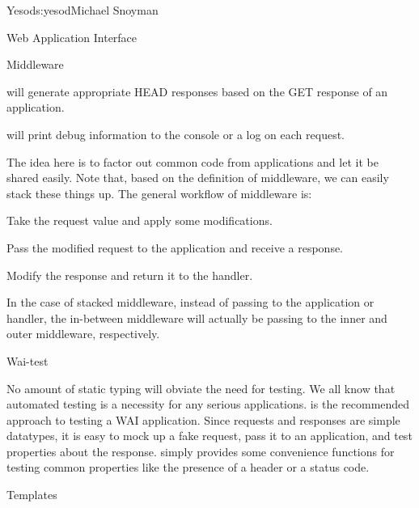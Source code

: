 \begin{aosachapter}{Yesod}{s:yesod}{Michael Snoyman}
\begin{aosasect1}{Web Application Interface}
\begin{aosasect2}{Middleware}
\begin{aosaitemize}
\item {} will generate appropriate HEAD responses based
  on the GET response of an application.

\item {} will print debug information to the console or a
  log on each request.

\end{aosaitemize}

The idea here is to factor out common code from applications and let
it be shared easily. Note that, based on the definition of 
middleware, we can easily stack these things up. The general workflow
of middleware is:

\begin{aosaenumerate}

\item Take the request value and apply some modifications.

\item Pass the modified request to the application and receive a
  response.

\item Modify the response and return it to the handler.

\end{aosaenumerate}

In the case of stacked middleware, instead of passing to the
application or handler, the in-between middleware will actually be passing to the
inner and outer middleware, respectively.

\end{aosasect2}

\begin{aosasect2}{Wai-test}

No amount of static typing will obviate the need for testing. We all
know that automated testing is a necessity for any serious
applications.  is the recommended approach to testing a
WAI application. Since requests and responses are simple datatypes, it
is easy to mock up a fake request, pass it to an application, and test
properties about the response.  simply provides some
convenience functions for testing common properties like the presence
of a header or a status code.

\end{aosasect2}

\end{aosasect1}

\begin{aosasect1}{Templates}


\end{aosasect1}
\end{aosachapter}
